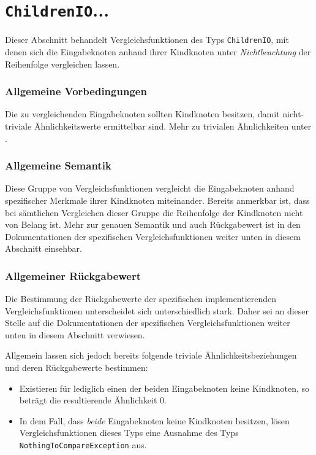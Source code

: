 %
%


\section{\texttt{ChildrenIO}...}
\label{strct:spec:childrenio}
Dieser Abschnitt behandelt Vergleichsfunktionen des Typs \texttt{ChildrenIO}, mit denen sich die Eingabeknoten anhand ihrer Kindknoten unter \emph{Nichtbeachtung} der Reihenfolge vergleichen lassen.

\subsubsection*{Allgemeine Vorbedingungen}
Die zu vergleichenden Eingabeknoten sollten Kindknoten besitzen, damit nicht-triviale Ähnlichkeitswerte ermittelbar sind. Mehr zu trivialen Ähnlichkeiten unter .

\subsubsection*{Allgemeine Semantik}
Diese Gruppe von Vergleichsfunktionen vergleicht die Eingabeknoten anhand spezifischer Merkmale ihrer Kindknoten miteinander. Bereits anmerkbar ist, dass bei sämtlichen Vergleichen dieser Gruppe die Reihenfolge der Kindknoten nicht von Belang ist. Mehr zur genauen Semantik und auch Rückgabewert ist in den Dokumentationen der spezifischen Vergleichsfunktionen weiter unten in diesem Abschnitt einsehbar.

\subsubsection*{Allgemeiner Rückgabewert}
Die Bestimmung der Rückgabewerte der spezifischen implementierenden Vergleichsfunktionen unterscheidet sich unterschiedlich stark. Daher sei an dieser Stelle auf die Dokumentationen der spezifischen Vergleichsfunktionen weiter unten in diesem Abschnitt verwiesen.

Allgemein lassen sich jedoch bereits folgende triviale Ähnlichkeitsbeziehungen und deren Rückgabewerte bestimmen:
\begin{itemize}
	\item Existieren für lediglich einen der beiden Eingabeknoten keine Kindknoten, so beträgt die resultierende Ähnlichkeit $0$.
	\item In dem Fall, dass \emph{beide} Eingabeknoten keine Kindknoten besitzen, lösen Vergleichsfunktionen dieses Typs eine Ausnahme des Typs \texttt{NothingToCompareException} aus.
\end{itemize}

